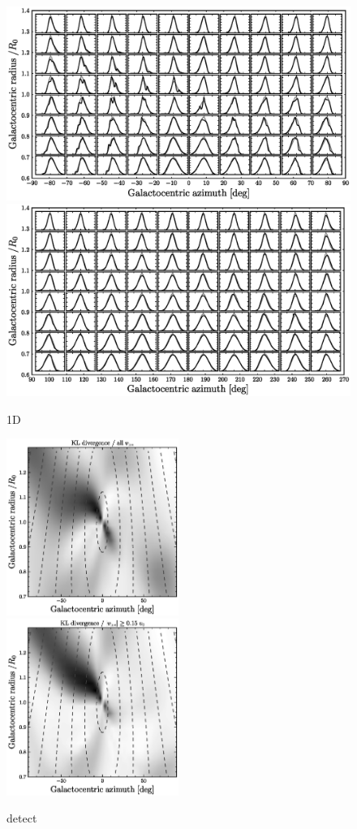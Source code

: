 \documentclass[12pt,preprint]{aastex}
\begin{document}
\clearpage
\begin{figure}
\includegraphics[width=\textwidth]{rphi1d.ps}\\
\includegraphics[width=\textwidth]{rphi1d2.ps}
\caption{1D}\label{fig:rphi1d}
\end{figure}

\clearpage
\begin{figure}
\includegraphics[width=0.5\textwidth]{detecta.ps}
\includegraphics[width=0.5\textwidth]{detectb.ps}
\caption{detect}\label{fig:detect}
\end{figure}
\end{document}
